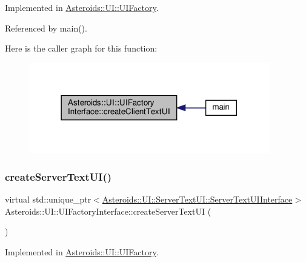 Implemented in \hyperlink{classAsteroids_1_1UI_1_1UIFactory_ac9a90bd87ef42d1b1af6ef9ff597aa28}{Asteroids\+::\+U\+I\+::\+U\+I\+Factory}.



Referenced by main().

Here is the caller graph for this function\+:\nopagebreak
\begin{figure}[H]
\begin{center}
\leavevmode
\includegraphics[width=297pt]{classAsteroids_1_1UI_1_1UIFactoryInterface_a6133ee6b7552c1f218df3e51aed91c74_icgraph}
\end{center}
\end{figure}
\mbox{\label{classAsteroids_1_1UI_1_1UIFactoryInterface_a830fa72105e7f123146383330f2fa8b9}} 
\subsubsection{\texorpdfstring{create\+Server\+Text\+U\+I()}{createServerTextUI()}}
{\footnotesize\ttfamily virtual std\+::unique\+\_\+ptr$<$\hyperlink{classAsteroids_1_1UI_1_1ServerTextUI_1_1ServerTextUIInterface}{Asteroids\+::\+U\+I\+::\+Server\+Text\+U\+I\+::\+Server\+Text\+U\+I\+Interface}$>$ Asteroids\+::\+U\+I\+::\+U\+I\+Factory\+Interface\+::create\+Server\+Text\+UI (\begin{DoxyParamCaption}{ }\end{DoxyParamCaption})\hspace{0.3cm}{\ttfamily [pure virtual]}}



Implemented in \hyperlink{classAsteroids_1_1UI_1_1UIFactory_abee314a786ce6f30022c008755e71805}{Asteroids\+::\+U\+I\+::\+U\+I\+Factory}.



